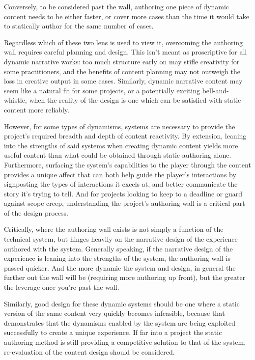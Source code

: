 Conversely, to be considered past the wall, authoring one piece of dynamic content needs to be either faster, or cover more cases than the time it would take to statically author for the same number of cases.

Regardless which of these two lens is used to view it, overcoming the authoring wall requires careful planning and design. This isn't meant as proscriptive for all dynamic narrative works: too much structure early on may stifle creativity for some practitioners, and the benefits of content planning may not outweigh the loss in creative output in some cases. Similarly, dynamic narrative content may seem like a natural fit for some projects, or a potentially exciting bell-and-whistle, when the reality of the design is one which can be satisfied with static content more reliably. 

However, for some types of dynamisms, systems are necessary to provide the project's required breadth and depth of content reactivity. By extension, leaning into the strengths of said systems when creating dynamic content yields more useful content than what could be obtained through static authoring alone. Furthermore, surfacing the system's capabilities to the player through the content provides a unique affect that can both help guide the player's interactions by signposting the types of interactions it excels at, and better communicate the story it's trying to tell. And for projects looking to keep to a deadline or guard against scope creep, understanding the project's authoring wall is a critical part of the design process.

Critically, where the authoring wall exists is not simply a function of the technical system, but hinges heavily on the narrative design of the experience authored with the system. Generally speaking, if the narrative design of the experience is leaning into the strengths of the system, the authoring wall is passed quicker. And the more dynamic the system and design, in general the further out the wall will be (requiring more authoring up front), but the greater the leverage once you're past the wall. 

Similarly, good design for these dynamic systems should be one where a static version of the same content very quickly becomes infeasible, because that demonstrates that the dynamisms enabled by the system are being exploited successfully to create a unique experience. If far into a project the static authoring method is still providing a competitive solution to that of the system, re-evaluation of the content design should be considered.

